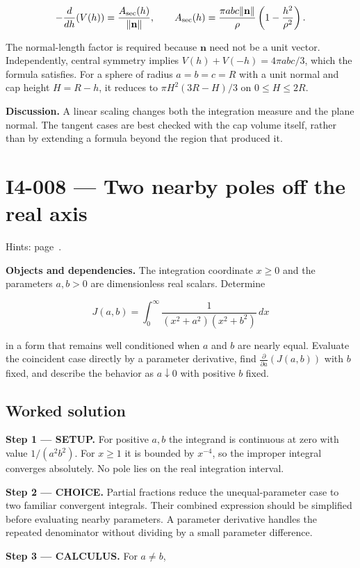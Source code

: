 \documentclass[11pt,oneside,openany]{book}
\begin{document}
\[
-\frac{d}{dh}(V(h))=\frac{A_{\rm sec}(h)}{\|\mathbf n\|},
\qquad
A_{\rm sec}(h)=\frac{\pi abc\|\mathbf n\|}{\rho}\left(1-\frac{h^2}{\rho^2}\right).
\]

The normal-length factor is required because \(\mathbf n\) need not be a unit vector. Independently, central symmetry implies \(V(h)+V(-h)=4\pi abc/3\), which the formula satisfies. For a sphere of radius \(a=b=c=R\) with a unit normal and cap height \(H=R-h\), it reduces to \(\pi H^2(3R-H)/3\) on \(0\le H\le2R\).

\textbf{Discussion.} A linear scaling changes both the integration measure and the plane normal. The tangent cases are best checked with the cap volume itself, rather than by extending a formula beyond the region that produced it.
\clearpage
\section{I4-008 --- Two nearby poles off the real axis}
\label{problem:I4-008}
{\small Hints: page~\pageref{hints:I4-008}.}\par\medskip

\textbf{Objects and dependencies.} The integration coordinate \(x\ge0\) and the parameters \(a,b>0\) are dimensionless real scalars. Determine

\[
J(a,b)=\int_0^\infty\frac{1}{(x^2+a^2)(x^2+b^2)}\,dx
\]

in a form that remains well conditioned when \(a\) and \(b\) are nearly equal. Evaluate the coincident case directly by a parameter derivative, find \(\frac{\partial}{\partial a}(J(a,b))\) with \(b\) fixed, and describe the behavior as \(a\downarrow0\) with positive \(b\) fixed.
\subsection*{Worked solution}

\textbf{Step 1 --- SETUP.} For positive \(a,b\) the integrand is continuous at zero with value \(1/(a^2b^2)\). For \(x\ge1\) it is bounded by \(x^{-4}\), so the improper integral converges absolutely. No pole lies on the real integration interval.

\begin{ChoiceStep}
\textbf{Step 2 --- CHOICE.} Partial fractions reduce the unequal-parameter case to two familiar convergent integrals. Their combined expression should be simplified before evaluating nearby parameters. A parameter derivative handles the repeated denominator without dividing by a small parameter difference.

\end{ChoiceStep}
\textbf{Step 3 --- CALCULUS.} For \(a\ne b\),
\end{document}
